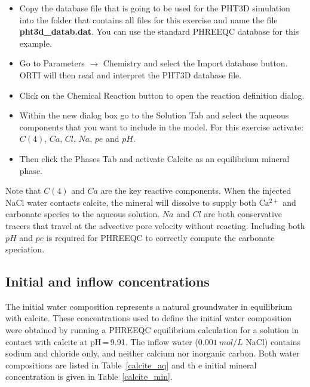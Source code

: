 \begin{itemize}

\item Copy the database file that is going to be used for the PHT3D
simulation into the folder that contains all files for this exercise
and name the file {\color{red}\textbf{pht3d\_datab.dat}}.
You can use the standard PHREEQC database for this example.

\item Go to {\color{blue}Parameters} $\rightarrow$
{\color{blue}Chemistry} and select the
{\color{blue}Import database} button.
ORTI will then read and interpret the PHT3D database file.

\item Click on the {\color{blue}Chemical Reaction} button to open the
reaction definition dialog.

\item Within the new dialog box go to the {\color{blue}Solution} Tab
and select the aqueous components that you want to include in the model.
For this exercise activate: $C(4)$, $Ca$, $Cl$, $Na$, $pe$ and $pH$.

\item Then click the {\color{blue}Phases} Tab and activate
{\color{blue}Calcite} as an equilibrium mineral phase.

\end{itemize}

Note that $C(4)$ and $Ca$ are the key reactive components.
When the injected NaCl water contacts calcite, the mineral will dissolve
to supply both $\mathrm{Ca^{2+}}$ and carbonate species to the aqueous solution. $Na$ and $Cl$ are both conservative tracers that travel at the advective pore velocity without reacting. Including both $pH$ and $pe$ is required for PHREEQC to correctly compute the carbonate speciation.

\subsection[Initial and inflow concentrations]{Initial and inflow concentrations}

The initial water composition represents a natural groundwater in
equilibrium with calcite. These concentrations used to define the initial water composition were obtained by running a PHREEQC equilibrium calculation for a solution in contact with calcite at pH\,=\,9.91.
The inflow water ($0.001\ mol/L$ NaCl) contains sodium and chloride
only, and neither calcium nor inorganic carbon.
Both water compositions are listed in Table~\ref{calcite_aq} and th e initial mineral concentration is given in Table~\ref{calcite_min}.

